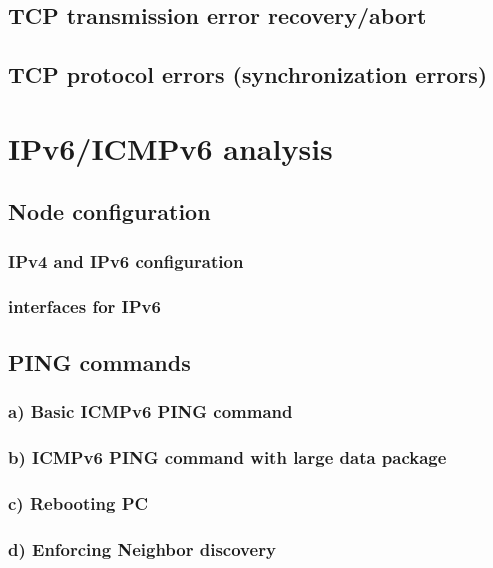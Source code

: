 \section{TCP transmission error recovery/abort}

\section{TCP protocol errors (synchronization errors)}

\chapter{IPv6/ICMPv6 analysis}
\label{ipv6}
\section{Node configuration}
\subsection{IPv4 and IPv6 configuration}
\subsection{interfaces for IPv6}

\section{PING commands}
\subsection{a) Basic ICMPv6 PING command}
\subsection{b) ICMPv6 PING command with large data package}
\subsection{c) Rebooting PC}
\subsection{d) Enforcing Neighbor discovery}
